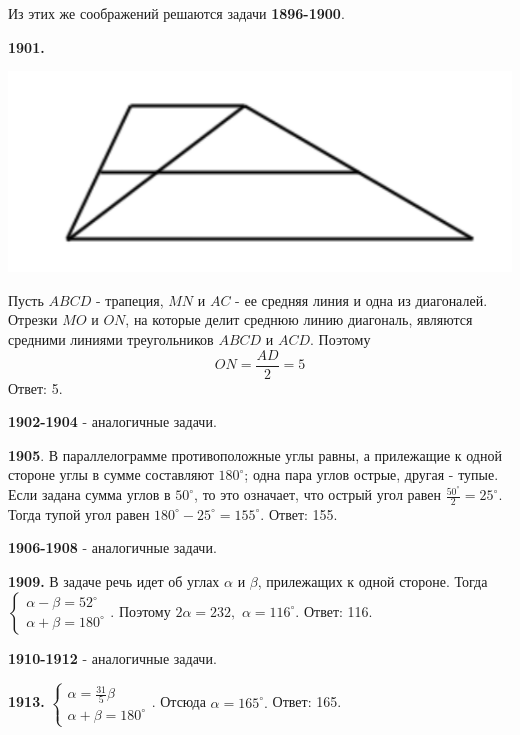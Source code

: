 Из этих же соображений решаются задачи \textbf{1896-1900}.

\textbf{1901.}

{\centering \includegraphics[width=0.5\linewidth]{Geometry/Content/25.png}
	
}

Пусть $ABCD$ - трапеция, $MN$ и $AC$ - ее средняя линия и одна из диагоналей. Отрезки $MO$ и $ON$, на которые делит среднюю линию диагональ, являются средними линиями треугольников $ABCD$ и $ACD$. Поэтому
\[
ON = \frac{AD}{2} = 5
\] \null \hspace*{\fill} Ответ: 5.

\textbf{1902-1904} - аналогичные задачи.

\textbf{1905}. В параллелограмме противоположные углы равны, а прилежащие к одной стороне углы в сумме составляют $180^\circ$; одна пара углов острые, другая - тупые. Если задана сумма углов в $50^\circ$, то это означает, что острый угол равен $\frac{50^\circ}{2} = 25^\circ$. Тогда тупой угол равен $180^\circ - 25^\circ = 155^\circ.$ \newline \null \hspace*{\fill} Ответ: 155.

\textbf{1906-1908} - аналогичные задачи.

\clearpage

\textbf{1909.} В задаче речь идет об углах $\alpha$ и $\beta$, прилежащих к одной стороне. Тогда   $\begin{cases} \alpha - \beta = 52^\circ \\ \alpha + \beta = 180^\circ \end{cases}$. Поэтому $2\alpha = 232,$ $\alpha = 116^\circ.$ \newline \null \hspace*{\fill} Ответ: 116.

\textbf{1910-1912} - аналогичные задачи.

\textbf{1913.} $\begin{cases} \alpha = \frac{31}{5}\beta \\ \alpha + \beta = 180^\circ \end{cases}$. Отсюда $\alpha = 165^\circ.$ \newline \null \hspace*{\fill} Ответ: 165.


